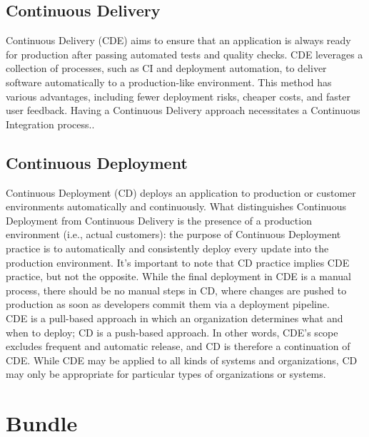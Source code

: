 \subsection{Continuous Delivery}
\label{subsec:good_practices_continuous_practices_continuous_delivery}

Continuous Delivery (CDE) aims to ensure that an application is always ready for
production after passing automated tests and quality checks. CDE leverages a collection
of processes, such as CI and deployment automation, to deliver software automatically
to a production-like environment. This method has various advantages, including fewer
deployment risks, cheaper costs, and faster user feedback. Having a Continuous
Delivery approach necessitates a Continuous Integration process.\cite{continuous_practices}.

\subsection{Continuous Deployment}
\label{subsec:good_practices_continuous_practices_continuous_deployment}

Continuous Deployment (CD) deploys an application to production or customer environments
automatically and continuously. What distinguishes Continuous Deployment from
Continuous Delivery is the presence of a production environment (i.e., actual customers):
the purpose of Continuous Deployment practice is to automatically and consistently
deploy every update into the production environment. It's important to note that
CD practice implies CDE practice, but not the opposite. While the final
deployment in CDE is a manual process, there should be no manual steps in CD,
where changes are pushed to production as soon as developers commit them via a
deployment pipeline. \\ %
CDE is a pull-based approach in which an organization determines what and when
to deploy; CD is a push-based approach. In other words, CDE's scope excludes frequent
and automatic release, and CD is therefore a continuation of CDE. While CDE may be
applied to all kinds of systems and organizations, CD may only be appropriate
for particular types of organizations or systems\cite{continuous_practices}.

\section{Bundle}
\label{sec:good_practices_bundle}

